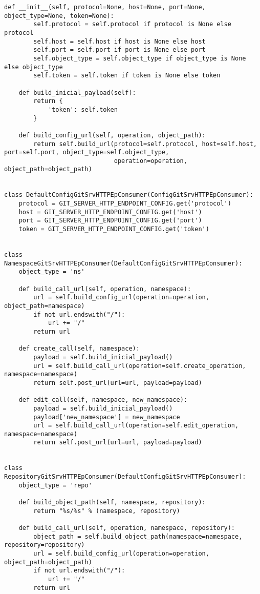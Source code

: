 \begin{lstlisting}[breaklines]
    def __init__(self, protocol=None, host=None, port=None, object_type=None, token=None):
        self.protocol = self.protocol if protocol is None else protocol
        self.host = self.host if host is None else host
        self.port = self.port if port is None else port
        self.object_type = self.object_type if object_type is None else object_type
        self.token = self.token if token is None else token

    def build_inicial_payload(self):
        return {
            'token': self.token
        }

    def build_config_url(self, operation, object_path):
        return self.build_url(protocol=self.protocol, host=self.host, port=self.port, object_type=self.object_type,
                              operation=operation, object_path=object_path)


class DefaultConfigGitSrvHTTPEpConsumer(ConfigGitSrvHTTPEpConsumer):
    protocol = GIT_SERVER_HTTP_ENDPOINT_CONFIG.get('protocol')
    host = GIT_SERVER_HTTP_ENDPOINT_CONFIG.get('host')
    port = GIT_SERVER_HTTP_ENDPOINT_CONFIG.get('port')
    token = GIT_SERVER_HTTP_ENDPOINT_CONFIG.get('token')


class NamespaceGitSrvHTTPEpConsumer(DefaultConfigGitSrvHTTPEpConsumer):
    object_type = 'ns'

    def build_call_url(self, operation, namespace):
        url = self.build_config_url(operation=operation, object_path=namespace)
        if not url.endswith("/"):
            url += "/"
        return url

    def create_call(self, namespace):
        payload = self.build_inicial_payload()
        url = self.build_call_url(operation=self.create_operation, namespace=namespace)
        return self.post_url(url=url, payload=payload)

    def edit_call(self, namespace, new_namespace):
        payload = self.build_inicial_payload()
        payload['new_namespace'] = new_namespace
        url = self.build_call_url(operation=self.edit_operation, namespace=namespace)
        return self.post_url(url=url, payload=payload)


class RepositoryGitSrvHTTPEpConsumer(DefaultConfigGitSrvHTTPEpConsumer):
    object_type = 'repo'

    def build_object_path(self, namespace, repository):
        return "%s/%s" % (namespace, repository)

    def build_call_url(self, operation, namespace, repository):
        object_path = self.build_object_path(namespace=namespace, repository=repository)
        url = self.build_config_url(operation=operation, object_path=object_path)
        if not url.endswith("/"):
            url += "/"
        return url


\end{lstlisting}
